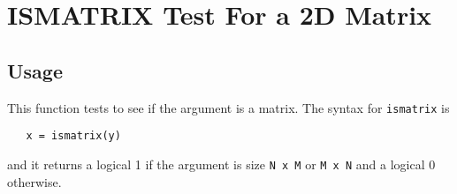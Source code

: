 \section{ISMATRIX Test For a 2D Matrix
}

\subsection{Usage}

This function tests to see if the argument is a matrix.  The 
syntax for \verb|ismatrix| is
\begin{verbatim}
   x = ismatrix(y)
\end{verbatim}
and it returns a logical 1 if the argument is size \verb|N x M| or
\verb|M x N| and a logical 0 otherwise.
